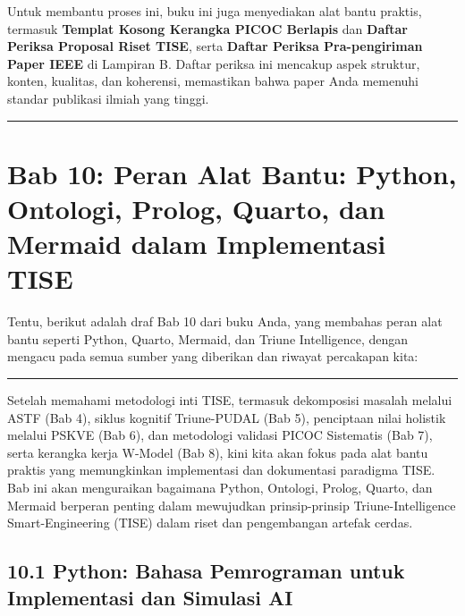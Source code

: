 \documentclass[
  letterpaper,
  DIV=11,
  numbers=noendperiod]{scrreprt}
\begin{document}
Untuk membantu proses ini, buku ini juga menyediakan alat bantu praktis,
termasuk \textbf{Templat Kosong Kerangka PICOC Berlapis} dan
\textbf{Daftar Periksa Proposal Riset TISE}, serta \textbf{Daftar
Periksa Pra-pengiriman Paper IEEE} di Lampiran B. Daftar periksa ini
mencakup aspek struktur, konten, kualitas, dan koherensi, memastikan
bahwa paper Anda memenuhi standar publikasi ilmiah yang tinggi.

\begin{center}\rule{0.5\linewidth}{0.5pt}\end{center}


\chapter{\texorpdfstring{\textbf{Bab 10: Peran Alat Bantu: Python,
Ontologi, Prolog, Quarto, dan Mermaid dalam Implementasi
TISE}}{Bab 10: Peran Alat Bantu: Python, Ontologi, Prolog, Quarto, dan Mermaid dalam Implementasi TISE}}\label{bab-10-peran-alat-bantu-python-ontologi-prolog-quarto-dan-mermaid-dalam-implementasi-tise}

Tentu, berikut adalah draf Bab 10 dari buku Anda, yang membahas peran
alat bantu seperti Python, Quarto, Mermaid, dan Triune Intelligence,
dengan mengacu pada semua sumber yang diberikan dan riwayat percakapan
kita:

\begin{center}\rule{0.5\linewidth}{0.5pt}\end{center}

Setelah memahami metodologi inti TISE, termasuk dekomposisi masalah
melalui ASTF (Bab 4), siklus kognitif Triune-PUDAL (Bab 5), penciptaan
nilai holistik melalui PSKVE (Bab 6), dan metodologi validasi PICOC
Sistematis (Bab 7), serta kerangka kerja W-Model (Bab 8), kini kita akan
fokus pada alat bantu praktis yang memungkinkan implementasi dan
dokumentasi paradigma TISE. Bab ini akan menguraikan bagaimana Python,
Ontologi, Prolog, Quarto, dan Mermaid berperan penting dalam mewujudkan
prinsip-prinsip Triune-Intelligence Smart-Engineering (TISE) dalam riset
dan pengembangan artefak cerdas.

\section{\texorpdfstring{\textbf{10.1 Python: Bahasa Pemrograman untuk
Implementasi dan Simulasi
AI}}{10.1 Python: Bahasa Pemrograman untuk Implementasi dan Simulasi AI}}\label{python-bahasa-pemrograman-untuk-implementasi-dan-simulasi-ai}
\end{document}
